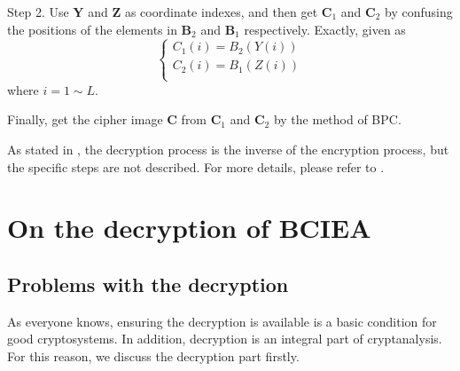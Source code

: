 \documentclass[final,3p,times,twocolumn]{elsarticle}
\begin{document}
\begin{itemize}
	Step 2. Use $\bm{Y}$ and $\bm{Z}$ as coordinate indexes, and then get $\bm{C}_1$ and $\bm{C}_2$ by confusing the positions of the elements in $\bm{B}_2$ and $\bm{B}_1$ respectively. Exactly, given as
	\begin{equation}
	\left\{ \begin{array}{l}
	C_1(i) = B_2(Y(i))\\
	C_2(i) = B_1(Z(i))\\
	\end{array} \right.
	\label{eq:confusion}
	\end{equation}
	where $i=1 \sim L$. 
	
	Finally, get the cipher image $\bm{C}$ from $\bm{C}_1$ and $\bm{C}_2$ by the method of BPC.
\end{itemize}
As stated in \cite{LuX2016OLE}, the decryption process is the inverse of the encryption process, but the specific steps are not described. For more details, please refer to \cite{LuX2016OLE}. 

\section{On the decryption of BCIEA}
\label{sec3:decryption}

\subsection{Problems with the decryption}

As everyone knows, ensuring the decryption is available is a basic condition for good cryptosystems. In addition, decryption is an integral part of cryptanalysis. For this reason, we discuss the decryption part firstly.
\end{document}
